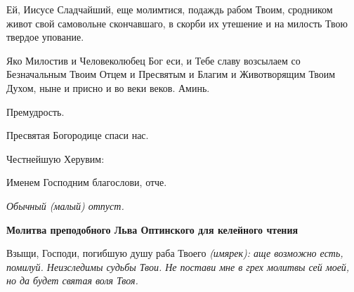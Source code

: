 Ей, Иисусе Сладчайший, еще молимтися, подаждь рабом Твоим, сродником живот свой самовольне скончавшаго, в скорби их утешение и на милость Твою твердое упование.


Яко Милостив и Человеколюбец Бог еси, и Тебе славу возсылаем со Безначальным Твоим Отцем и Пресвятым и Благим и Животворящим Твоим Духом, ныне и присно и во веки веков. Аминь.


Премудрость.


Пресвятая Богородице спаси нас.


Честнейшую Херувим:


Именем Господним благослови, отче.


\itshape Обычный (малый) отпуст\normalfont{}.





\bfseries Молитва преподобного Льва Оптинского для келейного чтения\normalfont{}


Взыщи, Господи, погибшую душу раба Твоего \itshape (имярек)\normalfont{}: аще возможно есть, помилуй. Неизследимы судьбы Твои. Не постави мне в грех молитвы сей моей, но да будет святая воля Твоя.


\mychapterending